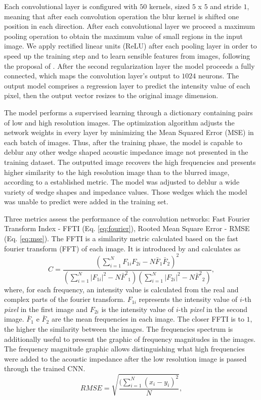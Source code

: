 \documentclass[conference,compsoc]{IEEEtran}
\begin{document}
Each convolutional layer is configured with $50$ kernels, sized $5$ x $5$
and stride $1$, meaning that after each convolution operation the blur kernel is shifted
one position in each direction. After each convolutional layer we proceed a maximum pooling operation
to obtain the maximum value of small regions in the input image. We
apply rectified linear units (ReLU) after each pooling layer in order to speed up the training
step and to learn sensible features from images, following the proposal of \cite{Nair2010}. After
the second regularization layer the model proceeds a fully connected, which maps the convolution layer's output
to $1024$ neurons. The output model comprises a regression layer to predict the intensity value of each pixel, then
the output vector resizes to the original image dimension.

The model performs a supervised learning through a dictionary containing pairs of low
and high resolution images. The optimization algorithm adjusts the 
network weights in every layer by minimizing the Mean Squared Error (MSE)
in each batch of images. Thus, after the training phase, the model is capable
to deblur any other wedge shaped acoustic impedance image not presented in the training dataset. The outputted
image recovers the high frequencies and presents higher similarity
to the high resolution image than to the blurred image, according to a established metric.
The model was adjusted to deblur a wide variety of wedge shapes and impedance values.
Those wedges which the model was unable to predict were added in the training set.

Three metrics assess the performance of the convolution networks: Fast Fourier Transform Index - FFTI (Eq. \ref{eq:fourier}),
Rooted Mean Square Error - RMSE (Eq. \ref{eq:mse}). 
The FFTI is a similarity metric calculated based on the fast fourier transform (FFT) of each image.
It is introduced by \cite{naranyana} and calculates as 
\begin{equation}
 C = \frac{ (\sum_{i=1}^{N}{F_{1i}F_{2i}} - N \bar{F}_1\bar{F}_2 )^2 }{ (\sum_{i=1}^{N}{|F_{1i}|^2} - N{\bar{F}^2}_1)( \sum_{i=1}^{N}{|F_{2i}|^2} - N{\bar{F}^2}_2 )},
 \label{eq:fourier}
\end{equation}
where, for each frequency, an intensity value is calculated from the real and complex parts of the fourier
transform. $F_{1i}$ represents the intensity value of $i$-th \textit{pixel} in the first image and $F_{2i}$
is the intensity value of $i$-th \textit{pixel} in the second image. $\bar{F}_1$ e $\bar{F}_2$ are the mean
frequencies in each image. The closer FFTI is to $1$, the higher the similarity between the images.
The frequencies spectrum is additionally useful to present the graphic of frequency magnitudes in the images.
The frequency magnitude graphic allows distinguishing what high frequencies were added to the acoustic impedance
after the low resolution image is passed through the trained CNN. 
\begin{equation}
 RMSE = \sqrt{\frac{ (\sum_{i=1}^{N}{(x_i -y_i)^2 } }{N}},
 \label{eq:mse}
\end{equation}
\end{document}
